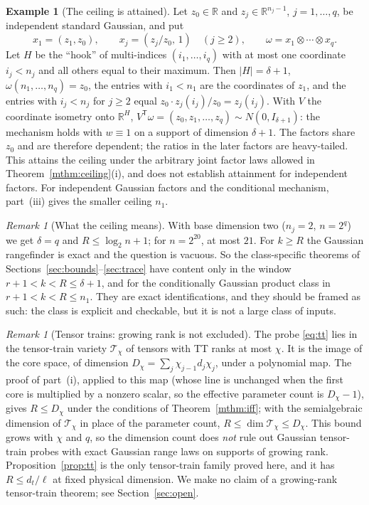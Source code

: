 \documentclass[11pt,a4paper]{article}
\theoremstyle{definition}
\newtheorem{example}[theorem]{Example}
\theoremstyle{remark}
\newtheorem{remark}[theorem]{Remark}
\numberwithin{equation}{section}
\newcommand{\R}{\mathbb R}
\newcommand{\T}{{\mathsf T}}
\begin{document}
\begin{example}[The ceiling is attained]\label{ex:hook}
Let $z_0\in\R$ and $z_j\in\R^{n_j-1}$, $j=1,\ldots,q$, be independent standard
Gaussian, and put
\[
 x_1=(z_1,z_0),\qquad x_j=(z_j/z_0,\,1)\quad(j\ge2),\qquad
 \omega=x_1\otimes\cdots\otimes x_q .
\]
Let $H$ be the ``hook'' of multi-indices $(i_1,\ldots,i_q)$ with at most one
coordinate $i_j<n_j$ and all others equal to their maximum. Then $|H|=\delta+1$,
$\omega(n_1,\ldots,n_q)=z_0$, the entries with $i_1<n_1$ are the coordinates
of $z_1$, and the entries with $i_j<n_j$ for $j\ge2$ equal
$z_0\cdot z_j(i_j)/z_0=z_j(i_j)$. With $V$ the coordinate isometry onto
$\R^H$, $V^\T\omega=(z_0,z_1,\ldots,z_q)\sim N(0,I_{\delta+1})$: the mechanism
holds with $w\equiv1$ on a support of dimension $\delta+1$. The factors share
$z_0$ and are therefore dependent; the ratios in the later factors are
heavy-tailed. This attains the ceiling under the arbitrary joint factor laws
allowed in Theorem~\ref{mthm:ceiling}(i), and does not establish attainment
for independent factors. For independent Gaussian factors and the
conditional mechanism, part~(iii) gives the smaller ceiling $n_1$.
\end{example}

\begin{remark}[What the ceiling means]\label{rem:window}
With base dimension two ($n_j=2$, $n=2^q$) we get $\delta=q$ and $R\le\log_2n+1$;
for $n=2^{20}$, at most $21$. For $k\ge R$ the Gaussian rangefinder is exact
and the question is vacuous. So the class-specific theorems of
Sections~\ref{sec:bounds}--\ref{sec:trace} have content only in the window
$r+1<k<R\le\delta+1$, and for the conditionally Gaussian product class in
$r+1<k<R\le n_1$. They are exact identifications, and they should be framed
as such: the class is explicit and checkable, but it is not a large class of
inputs.
\end{remark}

\begin{remark}[Tensor trains: growing rank is not excluded]\label{rem:tt-open}
The probe \eqref{eq:tt} lies in the tensor-train variety $\mathcal T_\chi$ of
tensors with TT ranks at most $\chi$. It is the image of the core space, of
dimension $D_\chi=\sum_j\chi_{j-1}d_j\chi_j$, under a polynomial map. The
proof of part~(i), applied to this map (whose line is unchanged when the first
core is multiplied by a nonzero scalar, so the effective parameter count is
$D_\chi-1$), gives $R\le D_\chi$ under the conditions of
Theorem~\ref{mthm:iff}; with the semialgebraic dimension of $\mathcal T_\chi$
in place of the parameter count, $R\le\dim\mathcal T_\chi\le D_\chi$. This bound grows with $\chi$ and $q$, so
the dimension count does \emph{not} rule out Gaussian tensor-train probes with
exact Gaussian range laws on supports of growing rank. Proposition~\ref{prop:tt}
is the only tensor-train family proved here, and it has $R\le d_t/\ell$ at fixed
physical dimension. We make no claim of a growing-rank tensor-train theorem;
see Section~\ref{sec:open}.
\end{remark}
\end{document}
